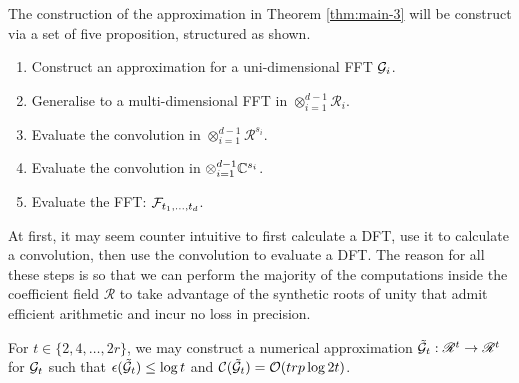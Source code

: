 The construction of the approximation in Theorem \ref{thm:main-3} will be construct via a set of five proposition, structured as shown.
\begin{enumerate}
    \item Construct an approximation for a uni-dimensional FFT $\mathcal G_i$.
    \item Generalise to a multi-dimensional FFT in $\otimes_{i=1}^{d-1} \mathscr{R}_i$.
    \item Evaluate the convolution in $\otimes_{i=1}^{d-1} \mathscr{R}^{s_i}$.
    \item Evaluate the convolution in $\otimes_{i=1}^{d-1} {\mathbb C}^{s_i}$.
    \item Evaluate the FFT: $\mathcal F_{t_1, \ldots, t_d}$.
\end{enumerate}

At first, it may seem counter intuitive to first calculate a DFT, use it to calculate a convolution, then use the convolution to evaluate a DFT. The reason for all these steps is so that we can perform the majority of the computations inside the coefficient field $\mathscr{R}$ to take advantage of the synthetic roots of unity that admit efficient arithmetic and incur no loss in precision.

\begin{lemma}\label{lem:first-lem}
    For $t \in \{2, 4, \ldots, 2r\}$, we may construct a numerical approximation $\tilde{\mathcal G}_t: \mathscr{R}^t \to \mathscr{R}^t$ for $\mathcal G_t$ such that $\epsilon (\tilde{\mathcal G}_t) \leq \log t$ and $\mathcal C(\tilde{\mathcal G}_t)= \mathcal O(trp \log 2t)$.
\end{lemma}

\medskip


